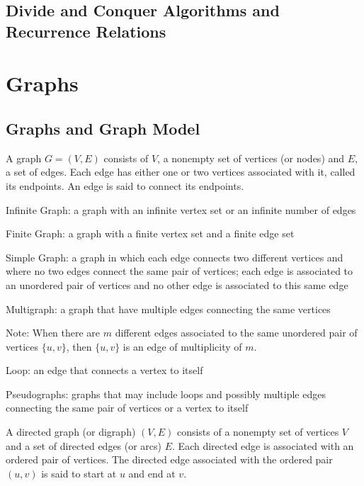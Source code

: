 \documentclass[12pt]{article}
\begin{document}
\subsection{Divide and Conquer Algorithms and Recurrence Relations}

\section{Graphs}
\subsection{Graphs and Graph Model}
\begin{definition} A graph $G = (V, E)$ consists of $V$, a nonempty set of vertices (or nodes) and $E$, a set of edges. Each edge has either one or two vertices associated with it, called its endpoints. An edge is said to connect its endpoints. \end{definition} 
\begin{definition} Infinite Graph: a graph with an infinite vertex set or an infinite number of edges \end{definition} 
\begin{definition} Finite Graph: a graph with a finite vertex set and a finite edge set \end{definition} 
\begin{definition} Simple Graph: a graph in which each edge connects two different vertices and where no two edges connect the same pair of vertices; each edge is associated to an unordered pair of vertices and no other edge is associated to this same edge  \end{definition} 
\begin{definition} Multigraph: a graph that have multiple edges connecting the same vertices \end{definition} 
Note: When there are $m$ different edges associated to the same unordered pair of vertices $\{u, v\}$, then $\{u, v\}$ is an edge of multiplicity of $m$. 
\begin{definition} Loop: an edge that connects a vertex to itself \end{definition} 
\begin{definition} Pseudographs: graphs that may include loops and possibly multiple edges connecting the same pair of vertices or a vertex to itself \end{definition}
\begin{definition} A directed graph (or digraph) $(V, E)$ consists of a nonempty set of vertices $V$ and a set of directed edges (or arcs) $E$. Each directed edge is associated with an ordered pair of vertices. The directed edge associated with the ordered pair $(u, v)$ is said to start at $u$ and end at $v$. \end{definition} 
\end{document}
